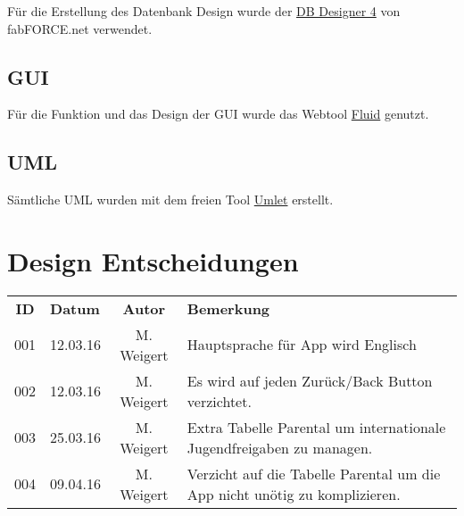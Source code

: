 Für die Erstellung des Datenbank Design wurde der \href{http://fabforce.net/dbdesigner4/}{DB Designer 4} von fabFORCE.net verwendet.

\subsection{GUI}

Für die Funktion und das Design der GUI wurde das Webtool \href{https://www.fluidui.com}{Fluid} genutzt.

\subsection{UML}

Sämtliche UML wurden mit dem freien Tool \href{http://www.umlet.com}{Umlet} erstellt.  

\section{Design Entscheidungen}

\begin{tabular}{|c|l|c|l|}
	\rowcolor{black} {\color{white}\textbf{ID}} & {\color{white}\textbf{Datum}} & {\color{white}\textbf{Autor}} & {\color{white}\textbf{Bemerkung}} \\
	001 & 12.03.16 & M. Weigert & Hauptsprache für App wird Englisch \\ \hline
	\rowcolor{DarkSeaGreen} 002 & 12.03.16 & M. Weigert & Es wird auf jeden Zurück/Back Button verzichtet. \\ \hline
	003 & 25.03.16 & M. Weigert & Extra Tabelle Parental um internationale Jugendfreigaben zu managen. \\ \hline
	\rowcolor{DarkSeaGreen} 004 & 09.04.16 & M. Weigert & Verzicht auf die Tabelle Parental um die App nicht unötig zu komplizieren. \\ \hline
\end{tabular}